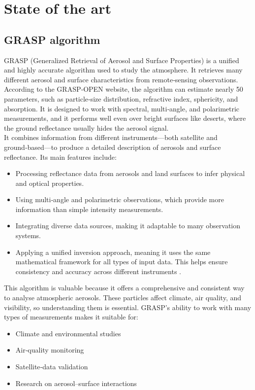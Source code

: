 \clearpage\section{State of the art}
\subsection{GRASP algorithm}

GRASP (Generalized Retrieval of Aerosol and Surface Properties) is a unified and highly accurate algorithm used to study the atmosphere. It retrieves many different aerosol and surface characteristics from remote‑sensing observations. According to the GRASP‑OPEN website, the algorithm can estimate nearly 50 parameters, such as particle‑size distribution, refractive index, sphericity, and absorption. It is designed to work with spectral, multi‑angle, and polarimetric measurements, and it performs well even over bright surfaces like deserts, where the ground reflectance usually hides the aerosol signal.\smallskip\\
It combines information from different instruments—both satellite and ground‑based—to produce a detailed description of aerosols and surface reflectance. Its main features include:
\begin{itemize}
  \item Processing reflectance data from aerosols and land surfaces to infer physical and optical properties.  
  \item Using multi‑angle and polarimetric observations, which provide more information than simple intensity measurements.  
  \item Integrating diverse data sources, making it adaptable to many observation systems.  
  \item Applying a unified inversion approach, meaning it uses the same mathematical framework for all types of input data. This helps ensure consistency and accuracy across different instruments \cite{grasp}.
\end{itemize}
This algorithm is valuable because it offers a comprehensive and consistent way to analyse atmospheric aerosols. These particles affect climate, air quality, and visibility, so understanding them is essential. GRASP’s ability to work with many types of measurements makes it suitable for:
\begin{itemize}
  \item Climate and environmental studies  
  \item Air‑quality monitoring  
  \item Satellite‑data validation  
  \item Research on aerosol–surface interactions
\end{itemize}

